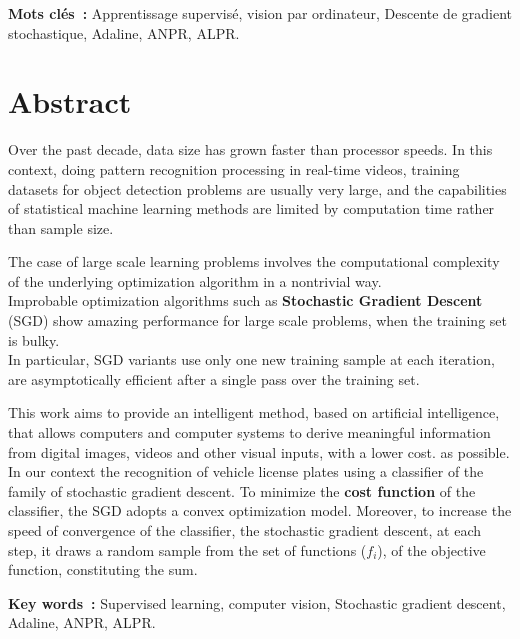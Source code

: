 	\begin{center}
		
	\end{center}
	\textbf{Mots clés~:} Apprentissage supervisé, vision par ordinateur, Descente de gradient stochastique, Adaline, ANPR, ALPR. 

\endgroup			

\vfill

\pagebreak




\begingroup
\let\clearpage\relax
\let\cleardoublepage\relax
\let\cleardoublepage\relax

\chapter*{Abstract}
	Over the past decade, data size has grown faster than processor speeds. In this context, doing pattern recognition processing in real-time videos, training datasets for object detection problems are usually very large, and the capabilities of statistical machine learning methods are limited by computation time rather than sample size.
	
	The case of large scale learning problems involves the computational complexity of the underlying optimization algorithm in a nontrivial way.\\
	Improbable optimization algorithms such as \textbf{Stochastic Gradient Descent} (SGD) show amazing performance for large scale problems, when the training set is bulky.\\
	In particular, SGD variants use only one new training sample at each iteration, are asymptotically efficient after a single pass over the training set.
	
	This work aims to provide an intelligent method, based on artificial intelligence, that allows computers and computer systems to derive meaningful information from digital images, videos and other visual inputs, with a lower cost. as possible. In our context the recognition of vehicle license plates using a classifier of the family of stochastic gradient descent. To minimize the \textbf{cost function} of the classifier, the SGD adopts a convex optimization model. Moreover, to increase the speed of convergence of the classifier, the stochastic gradient descent, at each step, it draws a random sample from the set of functions ($f_i$), of the objective function, constituting the sum.
	
	\begin{center}
		
	\end{center}
	\textbf{Key words~:} Supervised learning, computer vision, Stochastic gradient descent, Adaline, ANPR, ALPR.

	

\endgroup			

\vfill